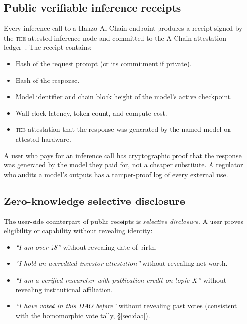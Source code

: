 \subsection{Public verifiable inference receipts}

Every inference call to a Hanzo AI Chain endpoint produces a receipt
signed by the \textsc{tee}-attested inference node and committed to the
A-Chain attestation ledger~\cite{lp-134-topology,hanzo-ai-chain}. The
receipt contains:

\begin{itemize}[nosep,leftmargin=1.2em]
\item Hash of the request prompt (or its commitment if private).
\item Hash of the response.
\item Model identifier and chain block height of the model's
  active checkpoint.
\item Wall-clock latency, token count, and compute cost.
\item \textsc{tee} attestation that the response was generated by the
  named model on attested hardware.
\end{itemize}

A user who pays for an inference call has cryptographic proof that the
response was generated by the model they paid for, not a cheaper
substitute. A regulator who audits a model's outputs has a tamper-proof
log of every external use.

\subsection{Zero-knowledge selective disclosure}

The user-side counterpart of public receipts is \emph{selective
disclosure}. A user proves eligibility or capability without revealing
identity:

\begin{itemize}[nosep,leftmargin=1.2em]
\item \emph{``I am over 18''} without revealing date of birth.
\item \emph{``I hold an accredited-investor attestation''} without
  revealing net worth.
\item \emph{``I am a verified researcher with publication credit on
  topic $X$''} without revealing institutional affiliation.
\item \emph{``I have voted in this DAO before''} without revealing
  past votes (consistent with the homomorphic vote tally,
  \S\ref{sec:dao}).
\end{itemize}

